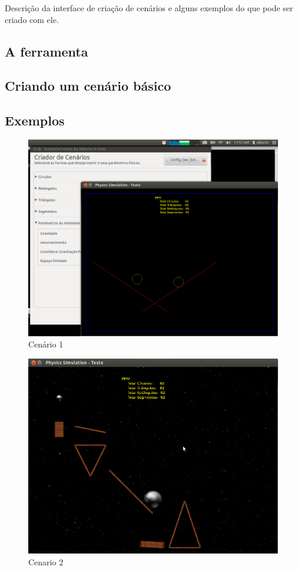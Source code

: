 Descrição da interface de criação de cenários e alguns exemplos do que pode ser criado com ele.

\subsection{A ferramenta}

\subsection{Criando um cenário básico}

\subsection{Exemplos}

\begin{figure}[H]
	\centering
	\caption{Cenário 1}
	\includegraphics[scale=0.3]{images/cenario-two-balls.png}
	\hspace{0.5cm}
\end{figure}  

  \begin{figure}[H]
	  \centering
	  \caption{Cenario 2}
    \includegraphics[scale=0.4]{images/cenario-todos.png}
  \end{figure}

